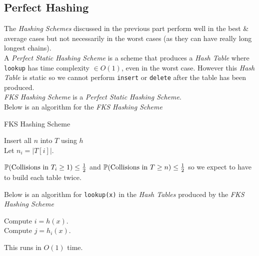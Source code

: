 \documentclass[11pt,a4paper]{article}
\begin{document}
\subsection{Perfect Hashing}

The \textit{Hashing Schemes} discussed in the previous part perform well in the best \& average cases but not necessarily in the worst cases (as they can have really long longest chains).\\

A \textit{Perfect Static Hashing Scheme} is a scheme that produces a \textit{Hash Table} where  \lstinline!lookup! has time complexity $\in O(1)$, even in the worst case. However this \textit{Hash Table} is static so we cannot perform \lstinline!insert! or \lstinline!delete! after the table has been produced.\\
\nb \textit{FKS Hashing Scheme} is a \textit{Perfect Static Hashing Scheme}.\\

Below is an algorithm for the \textit{FKS Hashing Scheme}\\
\begin{algorithm}[H]
\caption{FKS Hashing Scheme}
Insert all $n$ into $T$ using $h$\\
Let $n_i=|T[i]|$.\\
\end{algorithm}
\nb $\mathbb{P}(\text{Collisions in }T_i\geq1)\leq\frac12$ and \nb $\mathbb{P}(\text{Collisions in }T\geq n)\leq\frac12$ so we expect to have to build each table twice.\\


Below is an algorithm for \lstinline!lookup(x)! in the \textit{Hash Tables} produced by the \textit{FKS Hashing Scheme}
\begin{algorithm}[H]
\caption{FKS - \lstinline!lookup(x)!}
Compute $i=h(x)$.\\
Compute $j=h_i(x)$.\\
\end{algorithm}
\nb This runs in $O(1)$ time.\\
\end{document}
